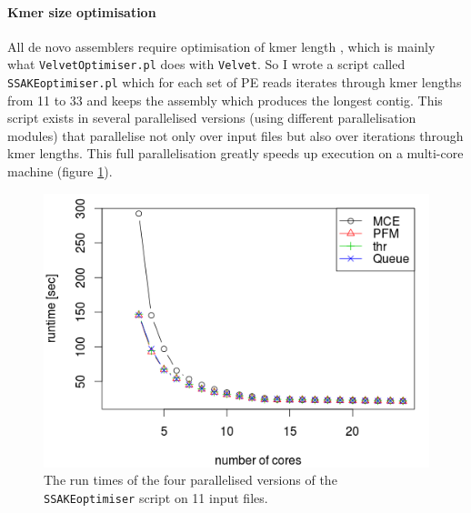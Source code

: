 \documentclass[a4paper,12pt,times,print,index,custombib,custommargin]{PhDThesisPSnPDF}\usepackage[]{graphicx}\usepackage[]{color}
\begin{document}
\paragraph{Kmer size optimisation}
All de novo assemblers require optimisation of \gls{kmer} length \citep{Davey2012}, which is mainly what \texttt{VelvetOptimiser.pl} does with \texttt{Velvet}. So I wrote a script called \texttt{SSAKEoptimiser.pl} which for each set of PE reads iterates through \gls{kmer} lengths from 11 to 33 and keeps the assembly which produces the longest contig. This script exists in several parallelised versions (using different parallelisation modules) that parallelise not only over input files but also over iterations through \gls{kmer} lengths. This full parallelisation greatly speeds up execution on a multi-core machine (figure \ref{runtimes}).
%
\begin{figure}
\centering
\includegraphics[width=.9\textwidth]{Parallel_Module_Comp}
\caption{The run times of the four parallelised versions of the \texttt{SSAKEoptimiser} script on 11 input files.}
\label{runtimes}
\end{figure}

%
%
%
\end{document}
